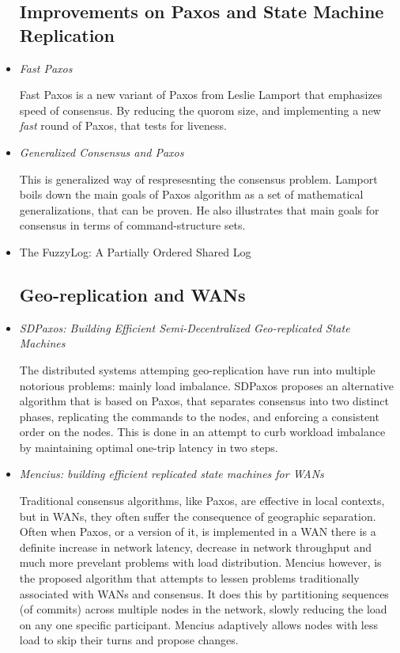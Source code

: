 \documentclass{article}
\begin{document}
\begin{itemize}

	\subsection{Improvements on Paxos and State Machine Replication}

	\item
	\textit{Fast Paxos} \cite{lamport2006fast}

	Fast Paxos is a new variant of Paxos from Leslie Lamport that emphasizes speed of consensus.
	By reducing the quorom size, and implementing a new \textit{fast} round of Paxos, that tests for liveness.

	\item
	\textit{Generalized Consensus and Paxos} \cite{lamport2005generalized}

	This is generalized way of respresesnting the consensus problem.
	Lamport boils down the main goals of Paxos algorithm as a set of mathematical generalizations, that can be proven. He also illustrates that main goals for consensus in terms of command-structure sets.

	\item{The FuzzyLog: A Partially Ordered Shared Log \cite{FuzzyLog}}

	\subsection{Geo-replication and WANs}

	\item
	\textit{SDPaxos: Building Efficient Semi-Decentralized Geo-replicated State Machines} \cite{zhao2018sdpaxos}

	The distributed systems attemping geo-replication have run into multiple notorious problems: mainly load imbalance.
	SDPaxos proposes an alternative algorithm that is based on Paxos, that separates consensus into two distinct phases, replicating the commands to the nodes, and enforcing a consistent order on the nodes.
	This is done in an attempt to curb workload imbalance by maintaining optimal one-trip latency in two steps.

	\item
	\textit{Mencius: building efficient replicated state machines for WANs} \cite{Mencius}

	Traditional consensus algorithms, like Paxos, are effective in local contexts, but in WANs, they often suffer the consequence of geographic separation.
	Often when Paxos, or a version of it, is implemented in a WAN there is a definite increase in network latency, decrease in network throughput and much more prevelant problems with load distribution.
	Mencius however, is the proposed algorithm that attempts to lessen problems traditionally associated with WANs and consensus.
	It does this by partitioning sequences (of commits) across multiple nodes in the network, slowly reducing the load on any one specific participant. Mencius adaptively allows nodes with less load to skip their turns and propose changes.


\end{itemize}
\end{document}
